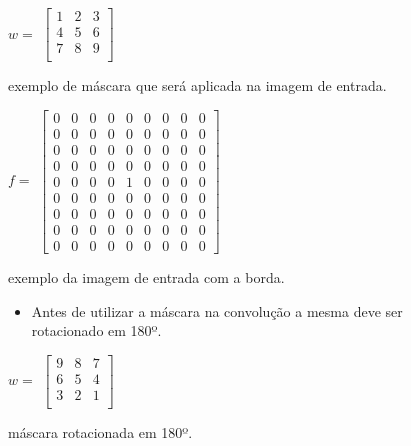 \begin{figure}[!htb]
	\centering
	$ w = $
	$
	\begin{bmatrix}
	    1 & 2 & 3 \\
	    4 & 5 & 6 \\
	    7 & 8 & 9 \\
	\end{bmatrix}
	$ %
	\caption{exemplo de máscara que será aplicada na imagem de entrada.}
	\label{fig:mask_correlation}
\end{figure}

\begin{figure}[!htb]
	\centering
	$ f = $
	$
	\begin{bmatrix}
	    0 & 0 & 0 & 0 & 0 & 0 & 0 & 0 & 0 \\
	    0 & 0 & 0 & 0 & 0 & 0 & 0 & 0 & 0 \\
	    0 & 0 & 0 & 0 & 0 & 0 & 0 & 0 & 0 \\
	    0 & 0 & 0 & 0 & 0 & 0 & 0 & 0 & 0 \\
	    0 & 0 & 0 & 0 & 1 & 0 & 0 & 0 & 0 \\
	    0 & 0 & 0 & 0 & 0 & 0 & 0 & 0 & 0 \\
	    0 & 0 & 0 & 0 & 0 & 0 & 0 & 0 & 0 \\
	    0 & 0 & 0 & 0 & 0 & 0 & 0 & 0 & 0 \\
	    0 & 0 & 0 & 0 & 0 & 0 & 0 & 0 & 0
	\end{bmatrix}
	$
	\caption{exemplo da imagem de entrada com a borda.}
\end{figure}

\begin{figure}[!htb]
	\begin{itemize}
		\item Antes de utilizar a máscara na convolução a mesma deve ser rotacionado em 180º.
	\end{itemize}
\end{figure}

\begin{figure}[!htb]
	\centering
	$ w = $
	$
	\begin{bmatrix}
	    9 & 8 & 7 \\
	    6 & 5 & 4 \\
	    3 & 2 & 1 \\
	\end{bmatrix}
	$ %
	\caption{máscara rotacionada em 180º.}
	\label{fig:mask_convolution}
\end{figure}

